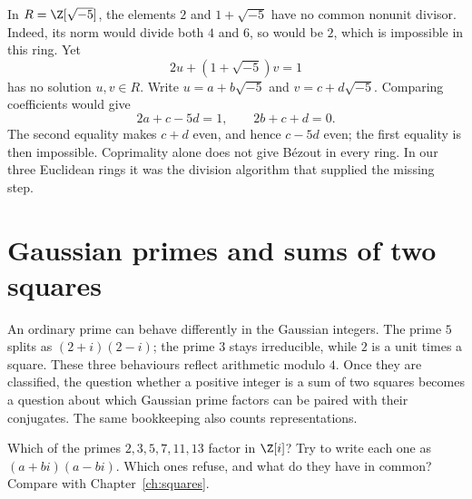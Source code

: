 \begin{examplex}
In $R=\Z[\sqrt{-5}]$, the elements $2$ and $1+\sqrt{-5}$ have no common nonunit divisor. Indeed, its norm would divide both $4$ and $6$, so would be $2$, which is impossible in this ring. Yet
\[
2u+(1+\sqrt{-5})v=1
\]
has no solution $u,v\in R$. Write $u=a+b\sqrt{-5}$ and $v=c+d\sqrt{-5}$. Comparing coefficients would give
\[
2a+c-5d=1,\qquad 2b+c+d=0.
\]
The second equality makes $c+d$ even, and hence $c-5d$ even; the first equality is then impossible. Coprimality alone does not give B\'ezout in every ring. In our three Euclidean rings it was the division algorithm that supplied the missing step.
\end{examplex}

\section{Gaussian primes and sums of two squares}

An ordinary prime can behave differently in the Gaussian integers. The prime $5$ splits as $(2+i)(2-i)$; the prime $3$ stays irreducible, while $2$ is a unit times a square. These three behaviours reflect arithmetic modulo $4$. Once they are classified, the question whether a positive integer is a sum of two squares becomes a question about which Gaussian prime factors can be paired with their conjugates. The same bookkeeping also counts representations.

\begin{think}
Which of the primes $2,3,5,7,11,13$ factor in $\Z[i]$? Try to write each one as $(a+bi)(a-bi)$. Which ones refuse, and what do they have in common? Compare with Chapter~\ref{ch:squares}.
\end{think}

